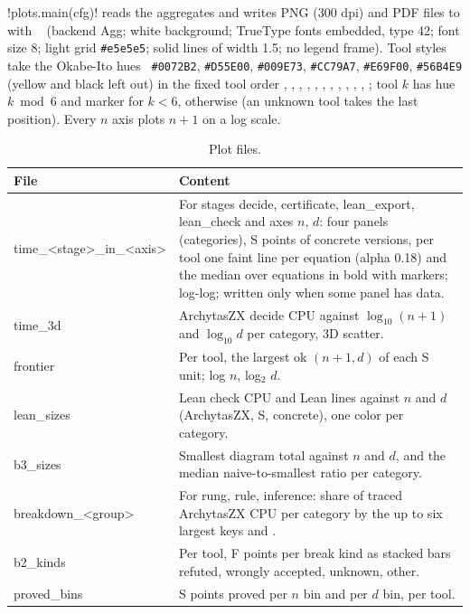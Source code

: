 \py!plots.main(cfg)! reads the aggregates and writes PNG (300 dpi) and PDF files to
 with ~\cite{hunter2007matplotlib}
(backend Agg; white background; TrueType fonts embedded, type 42; font size 8; light grid
\texttt{\#e5e5e5}; solid lines of width 1.5; no legend frame). Tool styles take the Okabe-Ito
hues~\cite{okabe2008color} \texttt{\#0072B2}, \texttt{\#D55E00}, \texttt{\#009E73}, \texttt{\#CC79A7},
\texttt{\#E69F00}, \texttt{\#56B4E9} (yellow and black left out) in the fixed tool order
, , , , , ,
, , , , ,
; tool $k$ has hue $k \bmod 6$ and marker  for $k<6$, 
otherwise (an unknown tool takes the last position). Every $n$ axis plots $n+1$ on a log scale.

\begin{xltabular}{\textwidth}{@{}>{\ttfamily}p{0.27\textwidth} X@{}}
\caption{Plot files.}\label{tab:bench-plots}\\
\toprule
\normalfont File & Content\\
\midrule\endfirsthead
\bottomrule\endfoot
time\_<stage>\_in\_<axis> & For stages decide, certificate, lean\_export, lean\_check and axes
  $n$, $d$: four panels (categories), S points of concrete versions, per tool one faint line per
  equation (alpha 0.18) and the median over equations in bold with markers; log-log; written
  only when some panel has data.\\
time\_3d & ArchytasZX decide CPU against $\log_{10}(n+1)$ and $\log_{10}d$ per category, 3D
  scatter.\\
frontier & Per tool, the largest ok $(n+1, d)$ of each S unit; log $n$, log$_2$ $d$.\\
lean\_sizes & Lean check CPU and Lean lines against $n$ and $d$ (ArchytasZX, S, concrete), one
  color per category.\\
b3\_sizes & Smallest diagram total against $n$ and $d$, and the median naive-to-smallest ratio
  per category.\\
breakdown\_<group> & For rung, rule, inference: share of traced ArchytasZX CPU per category by
  the up to six largest keys and .\\
b2\_kinds & Per tool, F points per break kind as stacked bars refuted, wrongly accepted, unknown,
  other.\\
proved\_bins & S points proved per $n$ bin and per $d$ bin, per tool.\\
\end{xltabular}

